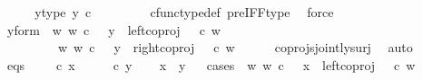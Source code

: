 \begin{isabellebody}
\ \ \isamarkupfalse%
\ \isamarkupfalse%
\ y{\isacharunderscore}{\kern0pt}type{\isacharcolon}{\kern0pt}\ {\isachardoublequoteopen}y\ {\isasymin}\isactrlsub c\ {\isacharparenleft}{\kern0pt}{\isasymone}{\isasymCoprod}{\isasymone}{\isacharparenright}{\kern0pt}{\isachardoublequoteclose}\ \ \isanewline
\ \ \ \ \isamarkupfalse%
\ cfunc{\isacharunderscore}{\kern0pt}type{\isacharunderscore}{\kern0pt}def\ pre{\isacharunderscore}{\kern0pt}IFF{\isacharunderscore}{\kern0pt}type\ \isamarkupfalse%
\ force\isanewline
\ \ \isamarkupfalse%
\ \isamarkupfalse%
\ y{\isacharunderscore}{\kern0pt}form{\isacharcolon}{\kern0pt}\ {\isachardoublequoteopen}{\isacharparenleft}{\kern0pt}{\isasymexists}\ w{\isachardot}{\kern0pt}\ {\isacharparenleft}{\kern0pt}w\ {\isasymin}\isactrlsub c\ {\isasymone}\ {\isasymand}\ y\ {\isacharequal}{\kern0pt}\ {\isacharparenleft}{\kern0pt}left{\isacharunderscore}{\kern0pt}coproj\ {\isasymone}\ {\isasymone}{\isacharparenright}{\kern0pt}\ {\isasymcirc}\isactrlsub c\ w{\isacharparenright}{\kern0pt}{\isacharparenright}{\kern0pt}\isanewline
\ \ \ \ \ \ {\isasymor}\ \ {\isacharparenleft}{\kern0pt}{\isasymexists}\ w{\isachardot}{\kern0pt}\ {\isacharparenleft}{\kern0pt}w\ {\isasymin}\isactrlsub c\ {\isasymone}\ {\isasymand}\ y\ {\isacharequal}{\kern0pt}\ {\isacharparenleft}{\kern0pt}right{\isacharunderscore}{\kern0pt}coproj\ {\isasymone}\ {\isasymone}{\isacharparenright}{\kern0pt}\ {\isasymcirc}\isactrlsub c\ w{\isacharparenright}{\kern0pt}{\isacharparenright}{\kern0pt}{\isachardoublequoteclose}\isanewline
\ \ \ \ \isamarkupfalse%
\ coprojs{\isacharunderscore}{\kern0pt}jointly{\isacharunderscore}{\kern0pt}surj\ \isamarkupfalse%
\ auto\isanewline
\isanewline
\ \ \isamarkupfalse%
\ eqs{\isacharcolon}{\kern0pt}\ {\isachardoublequoteopen}{\isasymlangle}{\isasymt}{\isacharcomma}{\kern0pt}\ {\isasymt}{\isasymrangle}\ {\isasymamalg}{\isasymlangle}{\isasymf}{\isacharcomma}{\kern0pt}\ {\isasymf}{\isasymrangle}\ {\isasymcirc}\isactrlsub c\ x\ {\isacharequal}{\kern0pt}\ {\isasymlangle}{\isasymt}{\isacharcomma}{\kern0pt}\ {\isasymt}{\isasymrangle}\ {\isasymamalg}{\isasymlangle}{\isasymf}{\isacharcomma}{\kern0pt}\ {\isasymf}{\isasymrangle}\ {\isasymcirc}\isactrlsub c\ y{\isachardoublequoteclose}\isanewline
\isanewline
\ \ \isamarkupfalse%
\ {\isachardoublequoteopen}x\ {\isacharequal}{\kern0pt}\ y{\isachardoublequoteclose}\isanewline
\ \ \isamarkupfalse%
{\isacharparenleft}{\kern0pt}cases\ {\isachardoublequoteopen}{\isasymexists}\ w{\isachardot}{\kern0pt}\ w\ {\isasymin}\isactrlsub c\ {\isasymone}\ {\isasymand}\ x\ {\isacharequal}{\kern0pt}\ left{\isacharunderscore}{\kern0pt}coproj\ {\isasymone}\ {\isasymone}\ {\isasymcirc}\isactrlsub c\ w{\isachardoublequoteclose}{\isacharparenright}{\kern0pt}\isanewline

\end{isabellebody}
